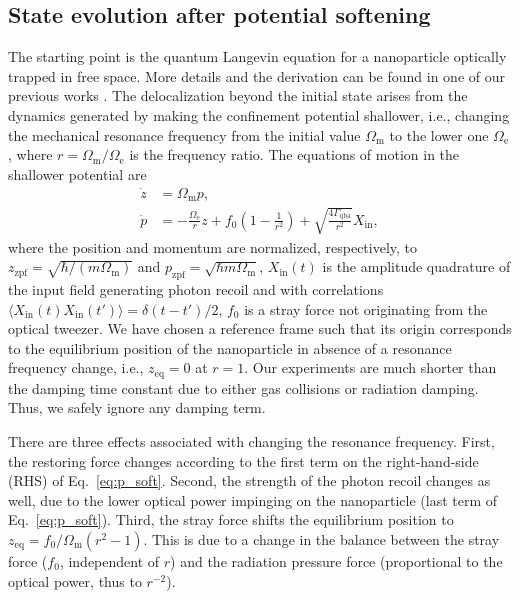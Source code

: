 \documentclass[aps, 
reprint, 
notitlepage,  superscriptaddress, 
onecolumn]{revtex4-1}
\newcommand{\<}{\langle}
\renewcommand{\>}{\rangle}
\newcommand{\inn}{\mathrm{in}}
\newcommand{\Om}{\Omega_\mathrm{m}}
\newcommand{\Gqba}{\Gamma_\text{qba}}
\newcommand{\Oe}{\Omega_\mathrm{e}}
\newcommand{\zzpf}{z_\text{zpf}}
\newcommand{\pzpf}{p_\text{zpf}}
\begin{document}
\subsection{State evolution after potential softening}\label{sec:theory_eom}
The starting point is the quantum Langevin equation for a nanoparticle optically trapped in free space. More details and the derivation can be found in one of our previous works \cite{militaru_ponderomotive_2022}.
%
The delocalization beyond the initial state arises from the dynamics generated by making the confinement potential shallower, i.e., changing the mechanical resonance frequency from the initial value $\Om$ to the lower one $\Oe$, where $r=\Om/\Oe$ is the frequency ratio.
%
The equations of motion in the shallower potential are 
\begin{subequations}
    \label{eq: second EOM}
    \begin{align}
    \dot{z} &= \Om p, \\
    \dot{p} &= -\frac{\Oe}{r} z + f_0\left(1-\frac{1}{r^2}\right) + \sqrt{\frac{4\Gqba}{r^2}} X_\inn,\label{eq:p_soft}
    \end{align}
\end{subequations}
where the position and momentum are normalized, respectively, to $\zzpf=\sqrt{\hbar/(m\Om)}$ and $\pzpf=\sqrt{\hbar m \Om}$, $X_\inn(t)$ is the amplitude quadrature of the input field generating photon recoil and  with correlations $\langle X_\inn(t) X_\inn(t')\rangle = \delta(t-t')/2$, $f_0$ is a stray force not originating from the optical tweezer.
%
We have chosen a reference frame such that its origin corresponds to the equilibrium position of the nanoparticle in absence of a resonance frequency change, i.e., $z_\mathrm{eq}=0$ at $r=1$.
%
Our experiments are much shorter than the damping time constant due to either gas collisions or radiation damping.
%
Thus, we safely ignore any damping term.

There are three effects associated with changing the resonance frequency. 
%
First, the restoring force changes according to the first term on the right-hand-side (RHS) of Eq.~\eqref{eq:p_soft}.
%
Second, the strength of the photon recoil changes as well, due to the lower optical power impinging on the nanoparticle (last term of Eq.~\eqref{eq:p_soft}).
%
Third, the stray force shifts the equilibrium position to $z_\mathrm{eq}=f_0/\Om \left(r^2-1\right)$.
%
This is due to a change in the balance between the stray force ($f_0$, independent of $r$) and the radiation pressure force (proportional to the optical power, thus to $r^{-2}$).
\end{document}
